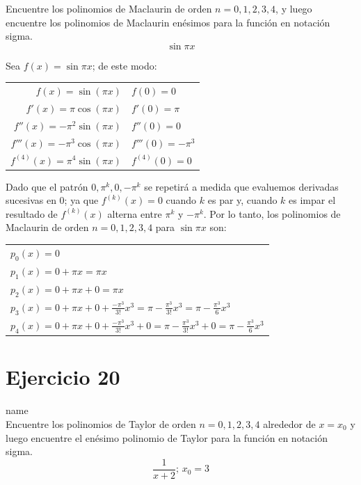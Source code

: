 \documentclass[12pt]{article}
\begin{document}
Encuentre los polinomios de Maclaurin de orden $n = 0, 1, 2, 3, 4$, y luego encuentre los polinomios de Maclaurin enésimos para la función en notación sigma.
\[\sin \pi x\]

Sea $f(x)=\sin \pi x$; de este modo:
\begin{center}
  \begin{tabular}{r l}
    $f(x)=\sin (\pi x)$ & $f(0)=0$ \\
    $f'(x)=\pi \cos (\pi x)$ & $f'(0)=\pi$ \\
    $f''(x)= - \pi ^2 \sin (\pi x)$ & $f''(0)=0$ \\
    $f'''(x)= - \pi ^3 \cos (\pi x)$ & $f'''(0)=-\pi ^3$ \\
    $f^{(4)}(x)= \pi ^4 \sin (\pi x)$ & $f^{(4)}(0)=0$ \\
  \end{tabular}
\end{center}
Dado que el patrón $0, \pi ^k, 0, -\pi ^k$ se repetirá a medida que evaluemos derivadas sucesivas en 0; ya que $f^{(k)}(x)=0$ cuando $k$ es par y, cuando $k$ es impar el resultado de $f^{(k)}(x)$ alterna entre $\pi ^k$ y $-\pi ^k$.
Por lo tanto, los polinomios de Maclaurin de orden $n = 0, 1, 2, 3, 4$ para $\sin \pi x$ son:
\begin{center}
  \begin{tabular}{l}
    $p_0(x)=0$ \\
    $p_1(x)=0+\pi x=\pi x$ \\
    $p_2(x)=0+\pi x+0=\pi x$ \\
    $p_3(x)=0+\pi x+0+\frac{-\pi ^3}{3!}x^3=\pi - \frac{\pi ^3}{3!}x^3=\pi - \frac{\pi ^3}{6}x^3$ \\
    $p_4(x)=0+\pi x+0+\frac{-\pi ^3}{3!}x^3+0=\pi - \frac{\pi ^3}{3!}x^3+0=\pi - \frac{\pi ^3}{6}x^3$ \\
  \end{tabular}
\end{center}

\section{Ejercicio 20} name \\

Encuentre los polinomios de Taylor de orden $n = 0, 1, 2, 3, 4$ alrededor de $x = x_0$ y luego encuentre el enésimo polinomio de Taylor para la función en notación sigma.
\[\frac{1}{x+2}\text{; }x_0=3\]
\end{document}
